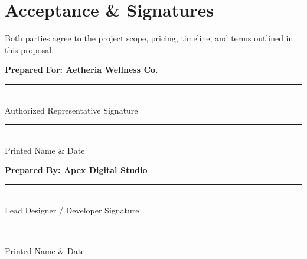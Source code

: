 \section{Acceptance \& Signatures}
Both parties agree to the project scope, pricing, timeline, and terms outlined in this proposal.

\parbreak
\vspace{0.25in}

\begin{minipage}[t]{0.47\linewidth}
    {\color{accent}\bfseries Prepared For: Aetheria Wellness Co.} \\
    \vspace{0.6cm}
    \rule{\linewidth}{0.5pt} \\
    {\small\color{muted} Authorized Representative Signature} \\
    \vspace{0.25cm}
    \rule{\linewidth}{0.5pt} \\
    {\small\color{muted} Printed Name \& Date}
\end{minipage}
\hfill
\begin{minipage}[t]{0.47\linewidth}
    {\color{accent}\bfseries Prepared By: Apex Digital Studio} \\
    \vspace{0.6cm}
    \rule{\linewidth}{0.5pt} \\
    {\small\color{muted} Lead Designer / Developer Signature} \\
    \vspace{0.25cm}
    \rule{\linewidth}{0.5pt} \\
    {\small\color{muted} Printed Name \& Date}
\end{minipage}
